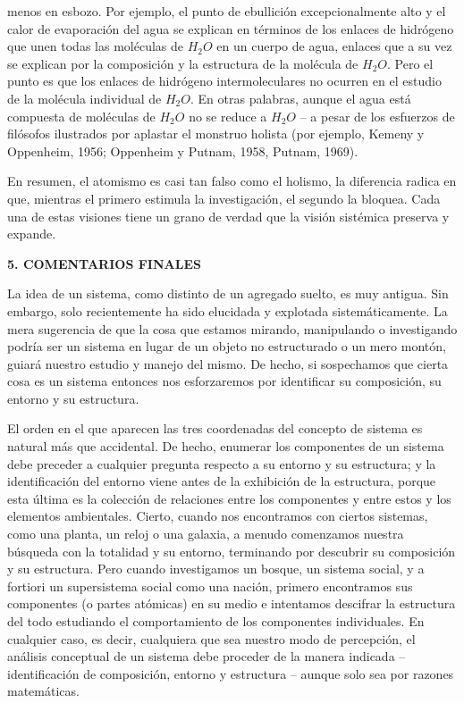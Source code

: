 {\fontsize{13}{16}\selectfont
menos en esbozo. Por ejemplo, el punto de ebullición excepcionalmente alto y el calor de evaporación del 
agua se explican en términos de los enlaces de hidrógeno que unen todas las moléculas de \( H_2O \) en un cuerpo de agua, 
enlaces que a su vez se explican por la composición y la estructura de la molécula de \( H_2O \). Pero el punto es que los enlaces de 
hidrógeno intermoleculares no ocurren en el estudio de la molécula individual de \( H_2O \). En otras palabras, 
aunque el agua está compuesta de moléculas de \( H_2O \) no se reduce a \( H_2O \) – a pesar de los esfuerzos de filósofos ilustrados por aplastar el monstruo holista 
(por ejemplo, Kemeny y Oppenheim, 1956; Oppenheim y Putnam, 1958, Putnam, 1969).

En resumen, el atomismo es casi tan falso como el holismo, la diferencia radica en que, 
mientras el primero estimula la investigación, el segundo la bloquea. Cada una de estas visiones tiene un grano de verdad que la visión sistémica preserva y expande.

\vspace{0.5cm}
\begin{center}
{\fontsize{13}{16}\selectfont \textbf{5. COMENTARIOS FINALES}}
\end{center}
\vspace{0.5cm}

La idea de un sistema, como distinto de un agregado suelto, es muy antigua. Sin embargo, solo recientemente ha sido elucidada y explotada sistemáticamente. 
La mera sugerencia de que la cosa que estamos mirando, manipulando o investigando podría ser un sistema en lugar de un objeto no estructurado o un mero montón, 
guiará nuestro estudio y manejo del mismo. De hecho, si sospechamos que cierta cosa es un sistema entonces nos esforzaremos por identificar su composición, su entorno y su estructura.

El orden en el que aparecen las tres coordenadas del concepto de sistema es natural más que accidental. De hecho, enumerar los componentes de un sistema debe preceder 
a cualquier pregunta respecto a su entorno y su estructura; y la identificación del entorno viene antes de la exhibición de la estructura, 
porque esta última es la colección de relaciones entre los componentes y entre estos y los elementos ambientales. Cierto, cuando nos encontramos con ciertos sistemas, 
como una planta, un reloj o una galaxia, a menudo comenzamos nuestra búsqueda con la totalidad y su entorno, terminando por descubrir su composición y su estructura. 
Pero cuando investigamos un bosque, un sistema social, y a fortiori un supersistema social como una nación, primero encontramos sus componentes (o partes atómicas) en su medio e intentamos descifrar 
la estructura del todo estudiando el comportamiento de los componentes individuales. En cualquier caso, es decir, cualquiera que sea nuestro modo de percepción, 
el análisis conceptual de un sistema debe proceder de la manera indicada – identificación de composición, entorno y estructura – aunque solo sea por razones matemáticas.
}

